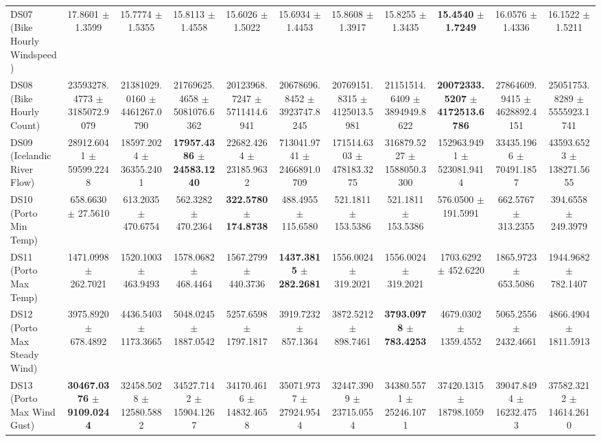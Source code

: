 \begin{table}[t]
{{\begin{tabular}{lcccccccccc}
DS07 (Bike Hourly Windspeed) & 17.8601 $\pm$ 1.3599 & 15.7774 $\pm$ 1.5355 & 15.8113 $\pm$ 1.4558 & 15.6026 $\pm$ 1.5022 & 15.6934 $\pm$ 1.4453 & 15.8608 $\pm$ 1.3917 & 15.8255 $\pm$ 1.3435 & \textbf{15.4540} $\pm$ \textbf{1.7249} & 16.0576 $\pm$ 1.4336 & 16.1522 $\pm$ 1.5211 \\
DS08 (Bike Hourly Count) & 23593278.4773 $\pm$ 3185072.9079 & 21381029.0160 $\pm$ 4461267.0790 & 21769625.4658 $\pm$ 5081076.6362 & 20123968.7247 $\pm$ 5711414.6941 & 20678696.8452 $\pm$ 3923747.8245 & 20769151.8315 $\pm$ 4125013.5981 & 21151514.6409 $\pm$ 3894949.8622 & \textbf{20072333.5207} $\pm$ \textbf{4172513.6786} & 27864609.9415 $\pm$ 4628892.4151 & 25051753.8289 $\pm$ 5555923.1741 \\
DS09 (Icelandic River Flow) & 28912.6041 $\pm$ 59599.2248 & 18597.2024 $\pm$ 36355.2401 & \textbf{17957.4386} $\pm$ \textbf{24583.1240} & 22682.4264 $\pm$ 23185.9632 & 713041.9741 $\pm$ 2466891.0709 & 171514.6303 $\pm$ 478183.3275 & 316879.5227 $\pm$ 1588050.3300 & 152963.9491 $\pm$ 523081.9414 & 33435.1966 $\pm$ 70491.1857 & 43593.6523 $\pm$ 138271.5655 \\
DS10 (Porto Min Temp) & 658.6630 $\pm$ 27.5610 & 613.2035 $\pm$ 470.6754 & 562.3282 $\pm$ 470.2364 & \textbf{322.5780} $\pm$ \textbf{174.8738} & 488.4955 $\pm$ 115.6580 & 521.1811 $\pm$ 153.5386 & 521.1811 $\pm$ 153.5386 & 576.0500 $\pm$ 191.5991 & 662.5767 $\pm$ 313.2355 & 394.6558 $\pm$ 249.3979 \\
DS11 (Porto Max Temp) & 1471.0998 $\pm$ 262.7021 & 1520.1003 $\pm$ 463.9493 & 1578.0682 $\pm$ 468.4464 & 1567.2799 $\pm$ 440.3736 & \textbf{1437.3815} $\pm$ \textbf{282.2681} & 1556.0024 $\pm$ 319.2021 & 1556.0024 $\pm$ 319.2021 & 1703.6292 $\pm$ 452.6220 & 1865.9723 $\pm$ 653.5086 & 1944.9682 $\pm$ 782.1407 \\
DS12 (Porto Max Steady Wind) & 3975.8920 $\pm$ 678.4892 & 4436.5403 $\pm$ 1173.3665 & 5048.0245 $\pm$ 1887.0542 & 5257.6598 $\pm$ 1797.1817 & 3919.7232 $\pm$ 857.1364 & 3872.5212 $\pm$ 898.7461 & \textbf{3793.0978} $\pm$ \textbf{783.4253} & 4679.0302 $\pm$ 1359.4552 & 5065.2556 $\pm$ 2432.4661 & 4866.4904 $\pm$ 1811.5913 \\
DS13 (Porto Max Wind Gust) & \textbf{30467.0376} $\pm$ \textbf{9109.0244} & 32458.5028 $\pm$ 12580.5882 & 34527.7142 $\pm$ 15904.1267 & 34170.4616 $\pm$ 14832.4658 & 35071.9737 $\pm$ 27924.9544 & 32447.3909 $\pm$ 23715.0554 & 34380.5571 $\pm$ 25246.1071 & 37420.1315 $\pm$ 18798.1059 & 39047.8494 $\pm$ 16232.4753 & 37582.3212 $\pm$ 14614.2610 \\

\end{tabular}}}
\end{table}
